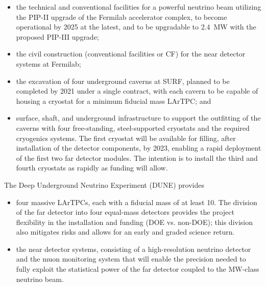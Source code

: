 \begin{itemize}

\item  the  technical and conventional facilities for a powerful  neutrino beam utilizing the PIP-II upgrade of the Fermilab accelerator 
complex, to become operational by 2025 
at the latest, and to be upgradable to \SI{2.4}{\MW} with the proposed 
PIP-III upgrade;

\item  the civil construction (conventional facilities or CF) for the near detector systems at Fermilab; 

\item the excavation of four underground caverns at SURF, planned to be completed 
by 2021 
under a single contract, with each cavern to be capable of housing a cryostat for
a minimum  fiducial mass LArTPC; and


\item surface, shaft, and underground infrastructure to support 
the outfitting of the caverns with four free-standing, steel-supported cryostats 
and the required cryogenics systems. The first cryostat will be available for filling, after installation of the detector components, by
2023, enabling a rapid deployment of the first two  far detector modules. 
The intention is to install the third and fourth cryostats as rapidly as funding will 
allow.

\end{itemize}

The Deep Underground Neutrino Experiment (DUNE) provides
\begin{itemize}

\item four massive LArTPCs, each with a fiducial mass of at least \SI{10}{\kt}. The division of 
the far detector into four equal-mass detectors provides the project flexibility 
in the installation and funding (DOE vs. non-DOE); this division also mitigates risks and allows for an early and graded science return.

\item the near detector systems, consisting of a high-resolution neutrino detector 
and the muon monitoring system that will enable %
the precision %
needed to fully 
exploit the statistical power of the %
far detector coupled to the %
MW-class 
neutrino beam.
\end{itemize}



